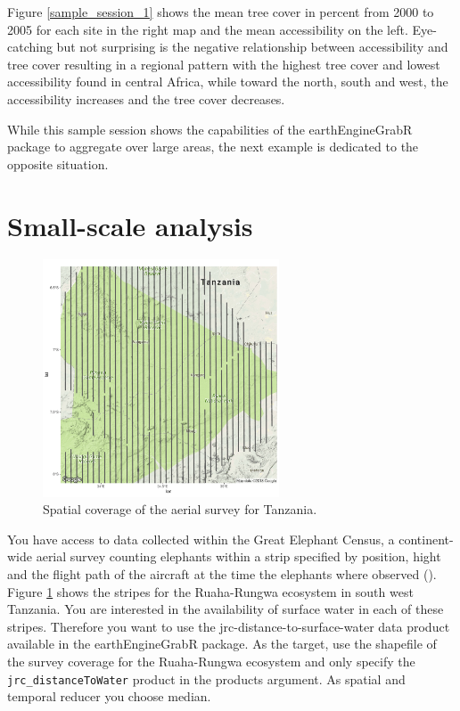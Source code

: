 Figure \ref{sample_session_1} shows the mean tree cover in percent from 2000 to 2005 for each site in the right map and the mean accessibility on the left. Eye-catching but not surprising is the negative relationship between accessibility and tree cover resulting in a regional pattern with the highest tree cover and lowest accessibility found in central Africa, while toward the north, south and west, the accessibility increases and the tree cover decreases.

While this sample session shows the capabilities of the earthEngineGrabR package to aggregate over large areas, the next example is dedicated to the opposite situation. 

\newpage

\section{Small-scale analysis}

\begin{figure}
	\begin{center}
		\vspace{-10mm}
		\includegraphics[width=7cm]{images/stripes-cropped.pdf}
		\caption{Spatial coverage of the aerial survey for Tanzania.}
		\label{stripes}
	\end{center}
\end{figure}

You have access to data collected within the Great Elephant Census, a continent-wide aerial survey counting  elephants within a strip specified by position, hight and the flight path of the aircraft at the time the elephants where observed (\cite{beale2017spatial}). 
Figure \ref{stripes} shows the stripes for the Ruaha-Rungwa ecosystem in south west Tanzania.
You are interested in the availability of surface water in each of these stripes. Therefore you want to use the jrc-distance-to-surface-water data product available in the earthEngineGrabR package. 
As the target, use the shapefile of the survey coverage for the Ruaha-Rungwa ecosystem and only specify the \texttt{jrc\_distanceToWater} product in the products argument. As spatial and temporal reducer you choose median. 

